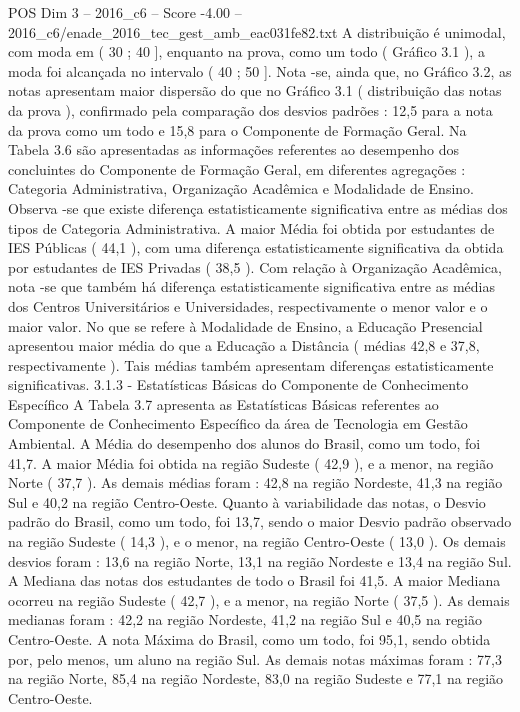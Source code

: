 \begin{textsample}{POS Dim 3 – 2016\_c6 – Score -4.00 – 2016\_c6/enade\_2016\_tec\_gest\_amb\_eac031fe82.txt}
A distribuição é unimodal, com moda em ( 30 ; 40 ], enquanto na prova, como um todo ( Gráfico 3.1 ), a moda foi alcançada no intervalo ( 40 ; 50 ].
Nota -se, ainda que, no Gráfico 3.2, as notas apresentam maior dispersão do que no Gráfico 3.1 ( distribuição das notas da prova ), confirmado pela comparação dos desvios padrões : 12,5 para a nota da prova como um todo e 15,8 para o Componente de Formação Geral.
Na Tabela 3.6 são apresentadas as informações referentes ao desempenho dos concluintes do Componente de Formação Geral, em diferentes agregações : Categoria Administrativa, Organização Acadêmica e Modalidade de Ensino.
Observa -se que existe diferença estatisticamente significativa entre as médias dos tipos de Categoria Administrativa.
A maior Média foi obtida por estudantes de IES Públicas ( 44,1 ), com uma diferença estatisticamente significativa da obtida por estudantes de IES Privadas ( 38,5 ).
Com relação à Organização Acadêmica, nota -se que também há diferença estatisticamente significativa entre as médias dos Centros Universitários e Universidades, respectivamente o menor valor e o maior valor.
No que se refere à Modalidade de Ensino, a Educação Presencial apresentou maior média do que a Educação a Distância ( médias 42,8 e 37,8, respectivamente ).
Tais médias também apresentam diferenças estatisticamente significativas. 3.1.3 - Estatísticas Básicas do Componente de Conhecimento Específico A Tabela 3.7 apresenta as Estatísticas Básicas referentes ao Componente de Conhecimento Específico da área de Tecnologia em Gestão Ambiental.
A Média do desempenho dos alunos do Brasil, como um todo, foi 41,7.
A maior Média foi obtida na região Sudeste ( 42,9 ), e a menor, na região Norte ( 37,7 ).
As demais médias foram : 42,8 na região Nordeste, 41,3 na região Sul e 40,2 na região Centro-Oeste.
Quanto à variabilidade das notas, o Desvio padrão do Brasil, como um todo, foi 13,7, sendo o maior Desvio padrão observado na região Sudeste ( 14,3 ), e o menor, na região Centro-Oeste ( 13,0 ).
Os demais desvios foram : 13,6 na região Norte, 13,1 na região Nordeste e 13,4 na região Sul.
A Mediana das notas dos estudantes de todo o Brasil foi 41,5.
A maior Mediana ocorreu na região Sudeste ( 42,7 ), e a menor, na região Norte ( 37,5 ).
As demais medianas foram : 42,2 na região Nordeste, 41,2 na região Sul e 40,5 na região Centro-Oeste.
A nota Máxima do Brasil, como um todo, foi 95,1, sendo obtida por, pelo menos, um aluno na região Sul.
As demais notas máximas foram : 77,3 na região Norte, 85,4 na região Nordeste, 83,0 na região Sudeste e 77,1 na região Centro-Oeste.

\end{textsample}

